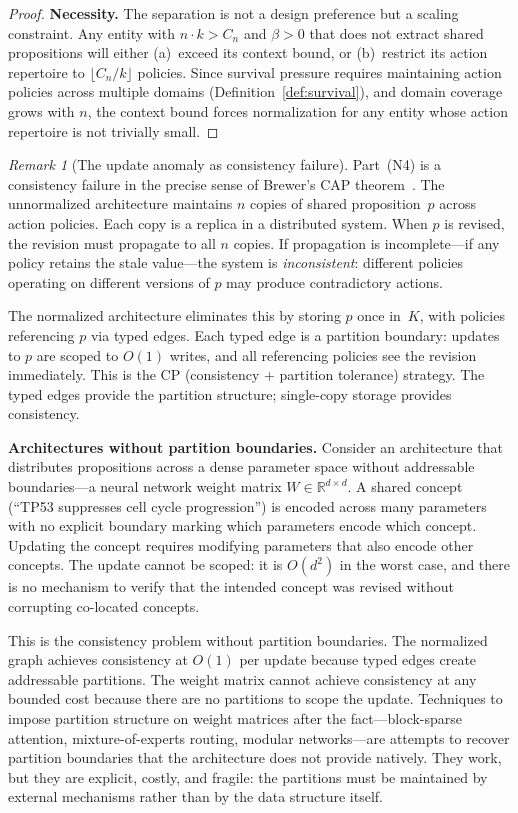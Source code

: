 \documentclass[11pt]{article}
\theoremstyle{definition}
\theoremstyle{remark}
\newtheorem*{remark}{Remark}
\begin{document}
\begin{proof}
\textbf{Necessity.}
The separation is not a design preference but a scaling constraint. Any
entity with $n \cdot k > C_n$ and $\beta > 0$ that does not extract
shared propositions will either (a)~exceed its context bound, or
(b)~restrict its action repertoire to $\lfloor C_n / k \rfloor$
policies. Since survival pressure requires maintaining action policies
across multiple domains (Definition~\ref{def:survival}), and domain
coverage grows with $n$, the context bound forces normalization for any
entity whose action repertoire is not trivially small.
\end{proof}

\begin{remark}[The update anomaly as consistency failure]
\label{rem:consistency}
Part~(N4) is a consistency failure in the precise sense of Brewer's CAP
theorem~\cite{Brewer2000, Gilbert2002}. The unnormalized architecture
maintains $n$ copies of shared proposition~$p$ across action policies.
Each copy is a replica in a distributed system. When $p$ is revised,
the revision must propagate to all $n$ copies. If propagation is
incomplete---if any policy retains the stale value---the system is
\emph{inconsistent}: different policies operating on different versions
of $p$ may produce contradictory actions.

The normalized architecture eliminates this by storing $p$ once in~$K$,
with policies referencing $p$ via typed edges. Each typed edge is a
partition boundary: updates to $p$ are scoped to $O(1)$ writes, and
all referencing policies see the revision immediately. This is the CP
(consistency + partition tolerance) strategy. The typed edges provide
the partition structure; single-copy storage provides consistency.

\textbf{Architectures without partition boundaries.}
Consider an architecture that distributes propositions across a dense
parameter space without addressable boundaries---a neural network weight
matrix $W \in \mathbb{R}^{d \times d}$. A shared concept (``TP53
suppresses cell cycle progression'') is encoded across many parameters
with no explicit boundary marking which parameters encode which
concept. Updating the concept requires modifying parameters that also
encode other concepts. The update cannot be scoped: it is $O(d^2)$ in
the worst case, and there is no mechanism to verify that the intended
concept was revised without corrupting co-located concepts.

This is the consistency problem without partition boundaries. The
normalized graph achieves consistency at $O(1)$ per update because typed
edges create addressable partitions. The weight matrix cannot achieve
consistency at any bounded cost because there are no partitions to scope
the update. Techniques to impose partition structure on weight matrices
after the fact---block-sparse attention, mixture-of-experts routing,
modular networks---are attempts to recover partition boundaries that the
architecture does not provide natively. They work, but they are
explicit, costly, and fragile: the partitions must be maintained by
external mechanisms rather than by the data structure itself.


\end{remark}
\end{document}
